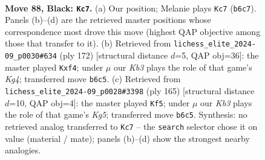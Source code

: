 \documentclass[11pt]{article}
\begin{document}
\begin{figure}[p]\centering
\begin{subfigure}{0.46\textwidth}\centering
\resizebox{\linewidth}{!}{%
\newchessgame
\chessboard[
  setfen={1R6/8/1k6/6K1/r6P/3r4/8/8 b - - 18 88},
  showmover=false,
  pgfstyle=straightmove, color=movearrow, markmove={b6-c7}
]}
\caption{}
\end{subfigure}\hfill
\begin{subfigure}{0.46\textwidth}\centering
\resizebox{\linewidth}{!}{%
\newchessgame
\chessboard[
  setfen={8/8/2R5/8/5rK1/2p5/3k4/8 w - - 0 87},
  showmover=false,
  pgfstyle=straightmove, color=movearrow, markmove={g4-f4}
]}
\caption{}
\end{subfigure}
\\[4pt]
\begin{subfigure}{0.46\textwidth}\centering
\resizebox{\linewidth}{!}{%
\newchessgame
\chessboard[
  setfen={8/8/1K6/P7/6k1/8/8/r7 b - - 2 83},
  showmover=false,
  pgfstyle=straightmove, color=movearrow, markmove={g4-f5}
]}
\caption{}
\end{subfigure}\hfill

\caption{\textbf{Move 88, Black: \texttt{Kc7}.} (a) Our position; Melanie plays \texttt{Kc7} (\texttt{b6c7}). Panels (b)--(d) are the retrieved master positions whose correspondence most drove this move (highest QAP objective among those that transfer to it). (b) Retrieved from \texttt{lichess\_elite\_2024-09\_p0030\#634} (ply 172) [structural distance $d$=5, QAP obj=36]: the master played \texttt{Kxf4}; under $\mu$ our \emph{Kb3} plays the role of that game's \emph{Kg4}; transferred move \texttt{b6c5}. (c) Retrieved from \texttt{lichess\_elite\_2024-09\_p0028\#3398} (ply 165) [structural distance $d$=10, QAP obj=4]: the master played \texttt{Kf5}; under $\mu$ our \emph{Kb3} plays the role of that game's \emph{Kg5}; transferred move \texttt{b6c5}. Synthesis: no retrieved analog transferred to \texttt{Kc7} -- the \texttt{search} selector chose it on value (material / mate); panels (b)--(d) show the strongest nearby analogies.}
\label{fig:thought-m175}
\end{figure}

\clearpage
\end{document}
